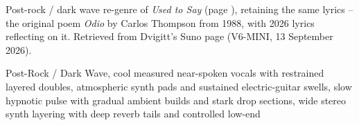 
\begin{notes}
Post-rock / dark wave re-genre of \emph{Used to Say} (page \pageref{sec:used-to-say}), retaining the same lyrics -- the original poem \emph{Odio} by Carlos Thompson from 1988, with 2026 lyrics reflecting on it. Retrieved from Dvigitt's Suno page (V6-MINI, 13 September 2026).
\end{notes}
\begin{style}
Post-Rock / Dark Wave, cool measured near-spoken vocals with restrained layered doubles, atmospheric synth pads and sustained electric-guitar swells, slow hypnotic pulse with gradual ambient builds and stark drop sections, wide stereo synth layering with deep reverb tails and controlled low-end
\end{style}
